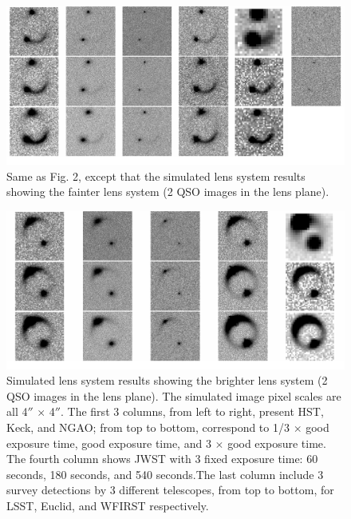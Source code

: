 \documentclass[a4paper,11pt]{article}
\begin{document}
\begin{figure}
\begin{center}
\includegraphics[width=1.0\textwidth]{figures/fainter_system_2QSOimages_all.png}
\end{center}
\caption{Same as Fig. 2, except that the simulated lens system results showing the fainter lens system (2 QSO images in the lens plane).}
\label{fig:fainter_2QSOimages_montage}
\end{figure}


\begin{figure}
\begin{center}
\includegraphics[width=1.0\textwidth]{figures/brighter_system_2QSOimages_all.png}
\end{center}
\caption{Simulated lens system results showing the brighter lens system (2 QSO images in the lens plane). The simulated image pixel scales are all 4$''$ $\times$ 4$''$. The first 3 columns, from left to right, present HST, Keck, and NGAO; from top to bottom, correspond to 1/3 $\times$ good exposure time, good exposure time, and 3 $\times$ good exposure time. The fourth column shows JWST with 3 fixed exposure time: 60 seconds, 180 seconds, and 540 seconds.The last column include 3 survey detections by 3 different telescopes, from top to bottom, for LSST, Euclid, and WFIRST respectively.}
\label{fig:brighter_2QSOimages_montage}
\end{figure}
\end{document}
